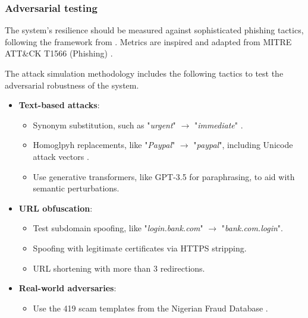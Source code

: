 
\subsubsection*{Adversarial testing}
The system's resilience should be measured against sophisticated phishing tactics, following the framework from \citep{kapoor2024comparative}. Metrics are inspired and adapted from MITRE ATT\&CK\textsuperscript{\textsuperscript{\textregistered}} T1566 (Phishing) \citep{mitre2020phishing}.\newline

\noindent The attack simulation methodology includes the following tactics to test the adversarial robustness of the system.

\begin{itemize}
  \item \textbf{Text-based attacks}:
  \begin{itemize}
    \item Synonym substitution, such as "\textit{urgent}" $\rightarrow$ "\textit{immediate}" \citep{andriu2023adaptive}.
    \item Homoglpyh replacements, like "\textit{Paypal}" $\rightarrow$ "\textit{paypal}", including Unicode attack vectors \citep{greco2023explaining}.
    \item Use generative transformers, like GPT-3.5 for paraphrasing, to aid with semantic perturbations.
  \end{itemize}
  \item \textbf{URL obfuscation}:
  \begin{itemize}
    \item Test subdomain spoofing, like "\textit{login.bank.com}" $\rightarrow$ "\textit{bank.com.login}".
    \item Spoofing with legitimate certificates via HTTPS stripping.
    \item URL shortening with more than 3 redirections.
  \end{itemize}
  \item \textbf{Real-world adversaries}:
  \begin{itemize}
    \item Use the 419 scam templates from the Nigerian Fraud Database \citep{champa2024phishing}.
  \end{itemize}
\end{itemize}


